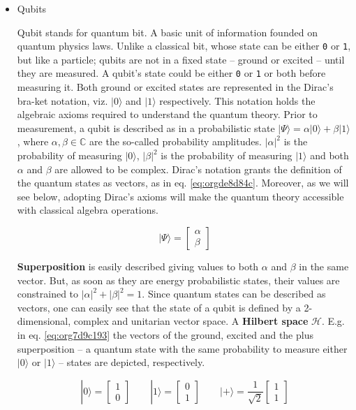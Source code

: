\begin{itemize}
\item Qubits
\label{sec:org26bde4e}

Qubit stands for quantum bit.
A basic unit of information founded on quantum physics laws.
Unlike a classical bit, whose state can be either \texttt{0} or \texttt{1}, but like a particle; qubits are not in a fixed state -- ground or excited -- until they are measured.
A qubit's state could be either \texttt{0} or \texttt{1} or both before measuring it.
Both ground or excited states are represented in the Dirac's bra-ket notation, viz. \(| 0 \rangle\) and \(| 1 \rangle\) respectively.
This notation holds the algebraic axioms \cite{Nielsen_2009} required to understand the quantum theory.
Prior to measurement, a qubit is described as in a probabilistic state \(| \Psi \rangle = \alpha | 0 \rangle + \beta | 1 \rangle\), where \(\alpha, \beta \in \mathbb{C}\) are the so-called probability amplitudes.
\(|\alpha|^2\) is the probability of measuring \(| 0 \rangle\), \(|\beta|^2\) is the probability of measuring \(| 1 \rangle\) and both \(\alpha\) and \(\beta\) are allowed to be complex.
Dirac's notation grants the definition of the quantum states as vectors, as in eq. \ref{eq:orgde8d84c}.
Moreover, as we will see below, adopting Dirac's axioms will make the quantum theory accessible with classical algebra operations. 

\begin{equation}
\label{eq:orgde8d84c}
|\Psi\rangle = \begin{bmatrix}\alpha \\ \beta \end{bmatrix}
\end{equation}

\textbf{Superposition} is easily described giving values to both \(\alpha\) and \(\beta\) in the same vector.
But, as soon as they are energy probabilistic states, their values are constrained to \(|\alpha|^2 + |\beta|^2 = 1\).
Since quantum states can be described as vectors, one can easily see that the state of a qubit is defined by a 2-dimensional, complex and unitarian vector space.
A \textbf{Hilbert space} \(\mathscr{H}\).
E.g. in eq. \ref{eq:org7d9c193} the vectors of the ground, excited and the plus superposition -- a quantum state with the same probability to measure either \(|0\rangle\) or \(|1\rangle\) -- states are depicted, respectively.

\begin{equation}
\label{eq:org7d9c193}
|0\rangle = \begin{bmatrix}1 \\ 0 \end{bmatrix} \quad \quad |1\rangle = \begin{bmatrix}0 \\ 1 \end{bmatrix} \quad \quad |+\rangle = \frac{1}{\sqrt{2}} \begin{bmatrix}1 \\ 1 \end{bmatrix}
\end{equation}


\end{itemize}
